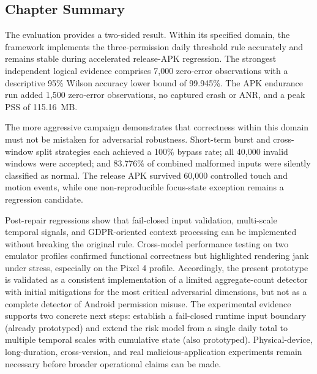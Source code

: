 \subsection{Chapter Summary}

The evaluation provides a two-sided result. Within its specified domain, the framework implements the three-permission daily threshold rule accurately and remains stable during accelerated release-APK regression. The strongest independent logical evidence comprises 7,000 zero-error observations with a descriptive 95\% Wilson accuracy lower bound of 99.945\%. The APK endurance run added 1,500 zero-error observations, no captured crash or ANR, and a peak PSS of 115.16~MB.

The more aggressive campaign demonstrates that correctness within this domain must not be mistaken for adversarial robustness. Short-term burst and cross-window split strategies each achieved a 100\% bypass rate; all 40,000 invalid windows were accepted; and 83.776\% of combined malformed inputs were silently classified as normal. The release APK survived 60,000 controlled touch and motion events, while one non-reproducible focus-state exception remains a regression candidate.

Post-repair regressions show that fail-closed input validation, multi-scale temporal signals, and GDPR-oriented context processing can be implemented without breaking the original rule. Cross-model performance testing on two emulator profiles confirmed functional correctness but highlighted rendering jank under stress, especially on the Pixel 4 profile. Accordingly, the present prototype is validated as a consistent implementation of a limited aggregate-count detector with initial mitigations for the most critical adversarial dimensions, but not as a complete detector of Android permission misuse. The experimental evidence supports two concrete next steps: establish a fail-closed runtime input boundary (already prototyped) and extend the risk model from a single daily total to multiple temporal scales with cumulative state (also prototyped). Physical-device, long-duration, cross-version, and real malicious-application experiments remain necessary before broader operational claims can be made.

